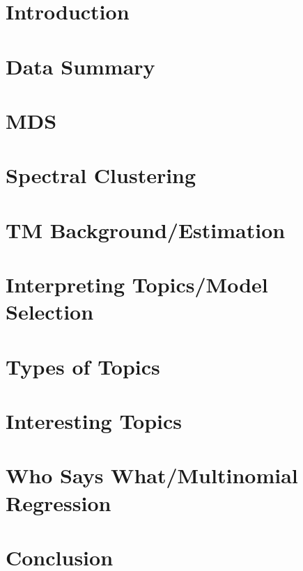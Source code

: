 \documentclass{article}
\begin{document}
\section{Introduction}

\section{Data Summary}

\section{MDS}

\section{Spectral Clustering}

\section{TM Background/Estimation}

\section{Interpreting Topics/Model Selection}

\section{Types of Topics}

\section{Interesting Topics}

\section{Who Says What/Multinomial Regression}

\section{Conclusion}
\end{document}
